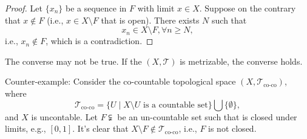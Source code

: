 \begin{proof}
Let $\{x_n\}$ be a sequence in $F$ with limit $x\in X$. 
Suppose on the contrary that $x\notin F$ 
(i.e., $x\in X\setminus F$ that is open). 
There exists $N$ such that
\[
x_n\in X\setminus F,\forall n\ge N,
\]
i.e., $x_n\notin F$, which is a contradiction.
\end{proof}
\begin{remark}
The converse may not be true. If the $(X,\mathcal{T})$ is metrizable, the converse holds.

Counter-example: Consider the co-countable topological space $(X,\mathcal{T}_{\text{co-co}})$, where 
\[
\mathcal{T}_{\text{co-co}}=
\{U\mid X\setminus U\text{ is a countable set}\}
\bigcup\{\emptyset\},
\]
and $X$ is uncontable. 
Let $F\subsetneqq$ be an un-countable set such that is closed under limits, e.g., $[0,1]$. It's clear that $X\setminus F\notin \mathcal{T}_{\text{co-co}}$, i.e., $F$ is not closed.
\end{remark}

